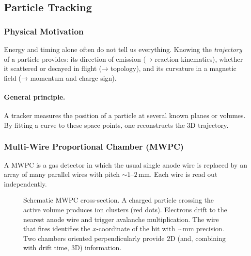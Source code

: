 \subsection{Particle Tracking}
\label{subsec:lec07:tracking}

\subsubsection*{Physical Motivation}
Energy and timing alone often do not tell us everything.  Knowing the
\emph{trajectory} of a particle provides:
its direction of emission (→ reaction kinematics), whether it scattered or
decayed in flight (→ topology), and its curvature in a magnetic field
(→ momentum and charge sign).

\paragraph{General principle.}
A tracker measures the position of a particle at several known planes or
volumes.  By fitting a curve to these space points, one reconstructs the
3D trajectory.

\subsubsection*{Multi-Wire Proportional Chamber (MWPC)}

A MWPC is a gas detector in which the usual single anode wire is replaced by
an array of many parallel wires with pitch $\sim 1$–$2\,\text{mm}$.  Each wire
is read out independently.

\begin{figure}[h]
\centering
{}
\caption{Schematic MWPC cross-section.  A charged particle crossing the active
volume produces ion clusters (red dots).  Electrons drift to the nearest
anode wire and trigger avalanche multiplication.  The wire that fires identifies
the $x$-coordinate of the hit with $\sim$mm precision.  Two chambers oriented
perpendicularly provide 2D (and, combining with drift time, 3D) information.}
\label{fig:lec07:mwpc}
\end{figure}

